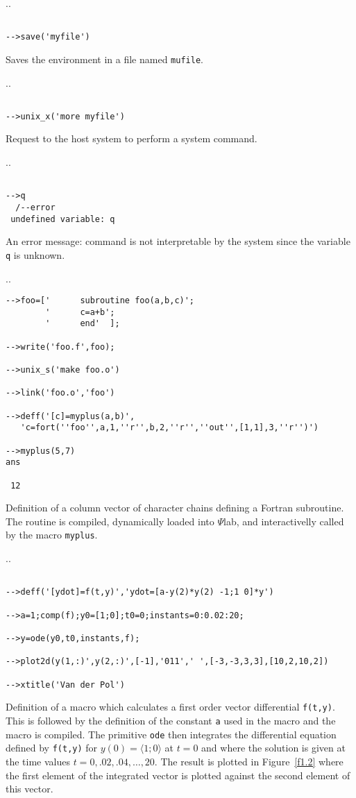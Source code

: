 \noindent.\dotfill.
\begin{verbatim}

-->save('myfile')
\end{verbatim}
Saves the environment in a file named {\tt mufile}.

\noindent.\dotfill.
\begin{verbatim}

-->unix_x('more myfile')
\end{verbatim}
Request to the host system to perform a system command.

\noindent.\dotfill.
\begin{verbatim}

-->q
  /--error 
 undefined variable: q       
\end{verbatim}
An error message: command is not interpretable by the system since the
variable {\tt q} is unknown.

\noindent.\dotfill.
\begin{verbatim}
-->foo=['      subroutine foo(a,b,c)';
        '      c=a+b';
        '      end'  ];

-->write('foo.f',foo);

-->unix_s('make foo.o') 

-->link('foo.o','foo')  

-->deff('[c]=myplus(a,b)',
   'c=fort(''foo'',a,1,''r'',b,2,''r'',''out'',[1,1],3,''r'')')

-->myplus(5,7)
ans

 12
\end{verbatim}
Definition of a column vector of character chains defining a Fortran
subroutine. The routine is compiled, dynamically loaded into $\Psi$lab,
and interactivelly called by the macro {\tt myplus}.

\noindent.\dotfill.
\begin{verbatim}
 
-->deff('[ydot]=f(t,y)','ydot=[a-y(2)*y(2) -1;1 0]*y')
 
-->a=1;comp(f);y0=[1;0];t0=0;instants=0:0.02:20;
 
-->y=ode(y0,t0,instants,f);
 
-->plot2d(y(1,:)',y(2,:)',[-1],'011',' ',[-3,-3,3,3],[10,2,10,2])
 
-->xtitle('Van der Pol')
\end{verbatim}
Definition of a macro which calculates a first order vector differential
{\tt f(t,y)}.  This is followed by the definition of the constant {\tt a}
used in the macro and the macro is compiled.  The primitive {\tt ode}
then integrates the differential equation defined by {\tt f(t,y)}
for $y(0)=\langle 1;0\rangle$ at $t=0$ and where the solution is given
at the time values $t=0,.02,.04,\ldots,20$.  The result is plotted in
Figure~\ref{f1.2} where the first element of the integrated vector is 
plotted against the second element of this vector.

